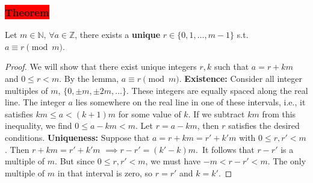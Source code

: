         \subsubsection{\colorbox{red}{Theorem}}
        Let \( m \in \mathbb{N},\, \forall a \in \mathbb{Z} \), there exists a \textbf{unique} \( r \in \{0, 1, \dots, m-1\} \) s.t. \( a \equiv r \pmod{m} \).\newline
            \begin{minipage}[t]{1\textwidth}
                \vspace*{0.1cm}
                \begin{proof}
                    We will show that there exist unique integers \( r, k \) such that \( a = r + km \) and \( 0 \leq r < m \). By the lemma, \( a \equiv r \pmod{m} \). \newline
                    \newline
                    \textbf{Existence:} Consider all integer multiples of \( m \), \( \{0, \pm m, \pm 2m, \dots \} \). These integers are equally spaced along the real line. The integer \( a \) lies somewhere on the real line in one of these intervals, i.e., it satisfies \( km \leq a < (k+1)m \) for some value of \( k \).
                    If we subtract \( km \) from this inequality, we find \( 0 \leq a - km < m \). Let \( r = a - km \), then \( r \) satisfies the desired conditions.\newline
                    \newline
                    \textbf{Uniqueness:} Suppose that \( a = r + km = r' + k'm \) with \( 0 \leq r, r' < m \). Then \(r + km = r' + k'm\) \(\implies r - r' = (k' - k)m.\) \,It follows that \( r - r' \) is a multiple of \( m \). But since \( 0 \leq r, r' < m \), we must have \( -m < r - r' < m \). The only multiple of \( m \) in that interval is zero, so \( r = r' \) and \( k = k' \).
                \end{proof}
            \end{minipage}
        
\newpage

